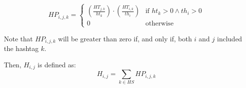 \begin{equation}
HP_{i,j,k} = \begin{cases}
\left( \frac{ HT_{j,k} }{ ht_k } \right) \cdot \left( \frac{ HT_{i,k} }{ th_i } \right) & \text{if } ht_k > 0 \wedge th_i > 0 \\
0 & \text{otherwise}
\end{cases}
\end{equation}

Note that $HP_{i,j,k}$ will be greater than zero if, and only if, both $i$ and $j$ included the hashtag $k$. 

Then, $H_{i,j}$ is defined as:
\begin{equation}
H_{i,j} = \sum_{k \in HS} HP_{i,j,k}
\end{equation}

